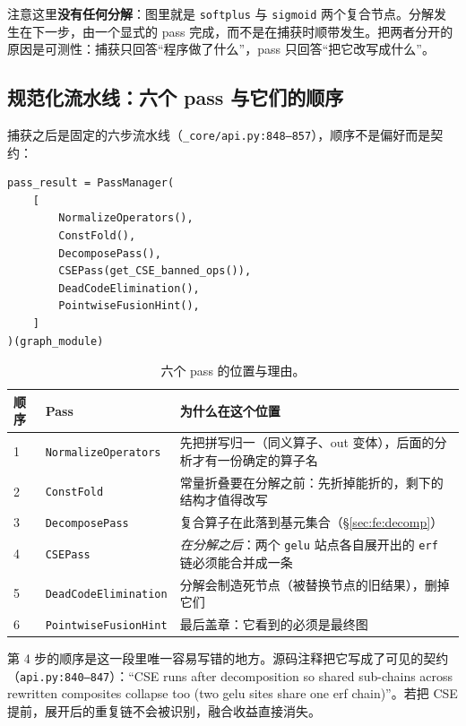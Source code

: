 注意这里\textbf{没有任何分解}：图里就是 \texttt{softplus} 与 \texttt{sigmoid} 两个复合节点。分解发生在下一步，由一个显式的 pass 完成，而不是在捕获时顺带发生。把两者分开的原因是可测性：捕获只回答“程序做了什么”，pass 只回答“把它改写成什么”。

\subsection{规范化流水线：六个 pass 与它们的顺序}

捕获之后是固定的六步流水线（\texttt{\_core/api.py:848--857}），顺序不是偏好而是契约：

\begin{lstlisting}[caption={默认规范化流水线（\texttt{\_core/api.py:848--857}）。}, label=lst:fe:passes, style=pystyle]
pass_result = PassManager(
    [
        NormalizeOperators(),
        ConstFold(),
        DecomposePass(),
        CSEPass(get_CSE_banned_ops()),
        DeadCodeElimination(),
        PointwiseFusionHint(),
    ]
)(graph_module)
\end{lstlisting}

\begin{table}[H]
\centering
\caption{六个 pass 的位置与理由。}
\label{tab:fe:passes}
\small
\begin{tabular}{lll}
\toprule
顺序 & Pass & 为什么在这个位置 \\
\midrule
1 & \texttt{NormalizeOperators} & 先把拼写归一（同义算子、out 变体），后面的分析才有一份确定的算子名 \\
2 & \texttt{ConstFold} & 常量折叠要在分解之前：先折掉能折的，剩下的结构才值得改写 \\
3 & \texttt{DecomposePass} & 复合算子在此落到基元集合（\S\ref{sec:fe:decomp}） \\
4 & \texttt{CSEPass} & \emph{在分解之后}：两个 \texttt{gelu} 站点各自展开出的 \texttt{erf} 链必须能合并成一条 \\
5 & \texttt{DeadCodeElimination} & 分解会制造死节点（被替换节点的旧结果），删掉它们 \\
6 & \texttt{PointwiseFusionHint} & 最后盖章：它看到的必须是最终图 \\
\bottomrule
\end{tabular}
\end{table}

第 4 步的顺序是这一段里唯一容易写错的地方。源码注释把它写成了可见的契约（\texttt{api.py:840--847}）：“CSE runs after decomposition so shared sub-chains across rewritten composites collapse too (two gelu sites share one erf chain)”。若把 CSE 提前，展开后的重复链不会被识别，融合收益直接消失。

